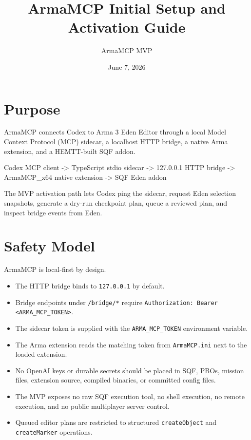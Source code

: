 \documentclass[11pt]{article}
\title{ArmaMCP Initial Setup and Activation Guide}
\author{ArmaMCP MVP}
\date{June 7, 2026}
\newcommand{\code}[1]{\texttt{#1}}
\begin{document}
\maketitle

\section{Purpose}

ArmaMCP connects Codex to Arma 3 Eden Editor through a local Model Context Protocol
(MCP) sidecar, a localhost HTTP bridge, a native Arma extension, and a HEMTT-built
SQF addon.

\begin{commandblock}
Codex MCP client
  -> TypeScript stdio sidecar
  -> 127.0.0.1 HTTP bridge
  -> ArmaMCP_x64 native extension
  -> SQF Eden addon
\end{commandblock}

The MVP activation path lets Codex ping the sidecar, request Eden selection
snapshots, generate a dry-run checkpoint plan, queue a reviewed plan, and inspect
bridge events from Eden.

\section{Safety Model}

ArmaMCP is local-first by design.

\begin{itemize}
  \item The HTTP bridge binds to \code{127.0.0.1} by default.
  \item Bridge endpoints under \code{/bridge/*} require \code{Authorization: Bearer <ARMA\_MCP\_TOKEN>}.
  \item The sidecar token is supplied with the \code{ARMA\_MCP\_TOKEN} environment variable.
  \item The Arma extension reads the matching token from \code{ArmaMCP.ini} next to the loaded extension.
  \item No OpenAI keys or durable secrets should be placed in SQF, PBOs, mission files,
        extension source, compiled binaries, or committed config files.
  \item The MVP exposes no raw SQF execution tool, no shell execution, no remote execution,
        and no public multiplayer server control.
  \item Queued editor plans are restricted to structured \code{createObject} and
        \code{createMarker} operations.
\end{itemize}
\end{document}
